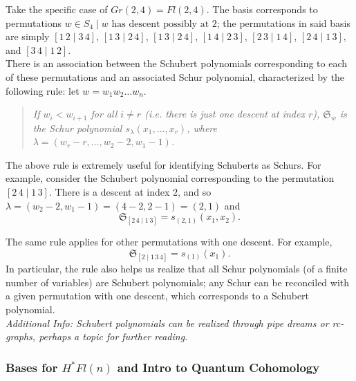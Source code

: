 Take the specific case of $Gr(2, 4) = Fl(2, 4)$. The basis corresponds to permutations 
$w \in S_4 \mid w \text{ has descent possibly at $2$}$; the permutations in said basis are simply $[1\, 2 \mid 3 \,4]$, $[1\,3 \mid 2\,4]$, $[1\, 3 \mid 2\,4]$, $[1\,4 \mid 2\,3]$, $[2\,3 \mid 1\,4]$, $[2\,4 \mid 1\,3]$, and $[3\,4 \mid 1\,2]$. \\

There is an association between the Schubert polynomials corresponding to each of these permutations and an associated Schur polynomial, characterized by the following rule: let $w = w_1 w_2 \dots w_n$. 
\begin{quote}
\textit{If $w_i < w_{i+1}$ for all $i \neq r$ (i.e. there is just one descent at index $r$), $\mathfrak{S}_w$ is the Schur polynomial $s_\lambda(x_1, \dots, x_r)$, where $\lambda = (w_r - r, \dots, w_2 - 2, w_1 - 1)$.}
\end{quote}

The above rule is extremely useful for identifying Schuberts as Schurs. For example, consider the Schubert polynomial corresponding to the permutation $[2\,4 \mid 1\,3]$. There is a descent at index $2$, and so $\lambda = (w_2 - 2, w_1 - 1) = (4 - 2, 2 - 1) = (2, 1)$ and
\[
    \mathfrak{S}_{[2\,4 \mid 1\,3]} = s_{(2, 1)}(x_1, x_2).
\]

The same rule applies for other permutations with one descent. For example, 
\[
    \mathfrak{S}_{[2 \mid 1\,3\,4]} = s_{(1)}(x_1).
\]
In particular, the rule also helps us realize that all Schur polynomials (of a finite number of variables) are Schubert polynomials; any Schur can be reconciled with a given permutation with one descent, which corresponds to a Schubert polynomial. \\

\textit{Additional Info: Schubert polynomials can be realized through pipe dreams or rc-graphs, perhaps a topic for further reading.}

\subsubsection{Bases for $H^* Fl(n)$ and Intro to Quantum Cohomology}

